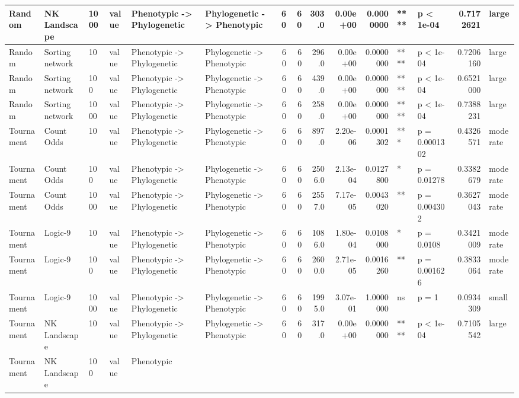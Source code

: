 \documentclass[]{book}
\begin{document}
\begin{table}
\begin{tabular}[t]{l|l|l|l|l|l|r|r|r|r|r|l|l|r|l}
\hline
Random & NK Landscape & 1000 & value & Phenotypic
    ->
Phylogenetic & Phylogenetic
    ->
Phenotypic & 60 & 60 & 303.0 & 0.00e+00 & 0.0000000 & **** & p < 1e-04 & 0.7172621 & large\\
\hline
Random & Sorting network & 10 & value & Phenotypic
    ->
Phylogenetic & Phylogenetic
    ->
Phenotypic & 60 & 60 & 296.0 & 0.00e+00 & 0.0000000 & **** & p < 1e-04 & 0.7206160 & large\\
\hline
Random & Sorting network & 100 & value & Phenotypic
    ->
Phylogenetic & Phylogenetic
    ->
Phenotypic & 60 & 60 & 439.0 & 0.00e+00 & 0.0000000 & **** & p < 1e-04 & 0.6521000 & large\\
\hline
Random & Sorting network & 1000 & value & Phenotypic
    ->
Phylogenetic & Phylogenetic
    ->
Phenotypic & 60 & 60 & 258.0 & 0.00e+00 & 0.0000000 & **** & p < 1e-04 & 0.7388231 & large\\
\hline
Tournament & Count Odds & 10 & value & Phenotypic
    ->
Phylogenetic & Phylogenetic
    ->
Phenotypic & 60 & 60 & 897.0 & 2.20e-06 & 0.0001302 & *** & p = 0.0001302 & 0.4326571 & moderate\\
\hline
Tournament & Count Odds & 100 & value & Phenotypic
    ->
Phylogenetic & Phylogenetic
    ->
Phenotypic & 60 & 60 & 2506.0 & 2.13e-04 & 0.0127800 & * & p = 0.01278 & 0.3382679 & moderate\\
\hline
Tournament & Count Odds & 1000 & value & Phenotypic
    ->
Phylogenetic & Phylogenetic
    ->
Phenotypic & 60 & 60 & 2557.0 & 7.17e-05 & 0.0043020 & ** & p = 0.004302 & 0.3627043 & moderate\\
\hline
Tournament & Logic-9 & 10 & value & Phenotypic
    ->
Phylogenetic & Phylogenetic
    ->
Phenotypic & 60 & 60 & 1086.0 & 1.80e-04 & 0.0108000 & * & p = 0.0108 & 0.3421009 & moderate\\
\hline
Tournament & Logic-9 & 100 & value & Phenotypic
    ->
Phylogenetic & Phylogenetic
    ->
Phenotypic & 60 & 60 & 2600.0 & 2.71e-05 & 0.0016260 & ** & p = 0.001626 & 0.3833064 & moderate\\
\hline
Tournament & Logic-9 & 1000 & value & Phenotypic
    ->
Phylogenetic & Phylogenetic
    ->
Phenotypic & 60 & 60 & 1995.0 & 3.07e-01 & 1.0000000 & ns & p = 1 & 0.0934309 & small\\
\hline
Tournament & NK Landscape & 10 & value & Phenotypic
    ->
Phylogenetic & Phylogenetic
    ->
Phenotypic & 60 & 60 & 317.0 & 0.00e+00 & 0.0000000 & **** & p < 1e-04 & 0.7105542 & large\\
\hline
Tournament & NK Landscape & 100 & value & Phenotypic

\end{tabular}
\end{table}
\end{document}
